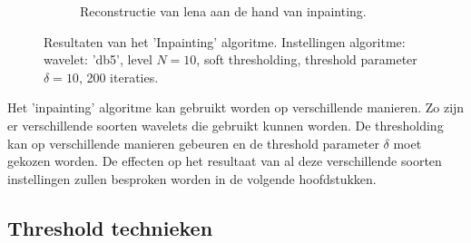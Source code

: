 \begin{figure}
\begin{subfigure}[b]{0.4\textwidth}
        \caption{Reconstructie van lena aan de hand van inpainting. }
        \label{fig:matti_fig_1f}
    \end{subfigure}
    \caption{Resultaten van het 'Inpainting' algoritme. Instellingen algoritme: wavelet: 'db5', level $N = 10$, soft thresholding, threshold parameter $\delta = 10$, 200 iteraties.}\label{fig:matti_fig_1}
\end{figure}


Het 'inpainting' algoritme kan gebruikt worden op verschillende manieren. Zo zijn er verschillende soorten wavelets die gebruikt kunnen worden. De thresholding kan op verschillende manieren gebeuren en de threshold parameter $\delta$ moet gekozen worden. De effecten op het resultaat van al deze verschillende soorten instellingen zullen besproken worden in de volgende hoofdstukken.



\subsection{Threshold technieken}

